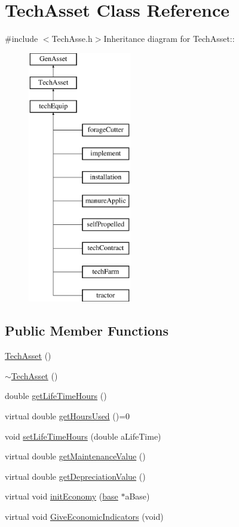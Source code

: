 \hypertarget{class_tech_asset}{
\section{TechAsset Class Reference}
\label{class_tech_asset}
}


{\ttfamily \#include $<$TechAsse.h$>$}Inheritance diagram for TechAsset::\begin{figure}[H]
\begin{center}
\leavevmode
\includegraphics[height=11cm]{class_tech_asset}
\end{center}
\end{figure}
\subsection*{Public Member Functions}
\begin{DoxyCompactItemize}
\item 
\hyperlink{class_tech_asset_a277fa3ff667feeaa41375ad0bedb37b1}{TechAsset} ()
\item 
\hyperlink{class_tech_asset_adc6ae9ac2d36b7e37ade4c4035f9a595}{$\sim$TechAsset} ()
\item 
double \hyperlink{class_tech_asset_acd60c183245533ce575098c7061f2d7b}{getLifeTimeHours} ()
\item 
virtual double \hyperlink{class_tech_asset_af2cd10df95cbd8d5095098e0c6c16722}{getHoursUsed} ()=0
\item 
void \hyperlink{class_tech_asset_ae6c2ae6c41c902723223012950f88467}{setLifeTimeHours} (double aLifeTime)
\item 
virtual double \hyperlink{class_tech_asset_a72e1db80b26fc920318a3f98ec814b06}{getMaintenanceValue} ()
\item 
virtual double \hyperlink{class_tech_asset_ac855fd27bd197ef63d91588fcd7416c5}{getDepreciationValue} ()
\item 
virtual void \hyperlink{class_tech_asset_a405c511686ff6c8051ee748db53cd045}{initEconomy} (\hyperlink{classbase}{base} $\ast$aBase)
\item 
virtual void \hyperlink{class_tech_asset_ac7681ccf18e41a30b518f27cbde6a160}{GiveEconomicIndicators} (void)
\end{DoxyCompactItemize}


